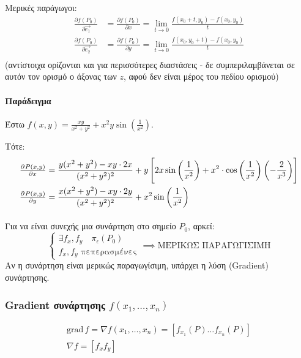 \documentclass[11pt,a4paper,titlepage,draft]{article}
\newcommand{\textlatin}[1]{#1}
\begin{document}
Μερικές παράγωγοι:
\begin{align*}
\frac{\partial f(P_0)}{\partial \vec{e_1}} &= \frac{\partial f(P_0)}{\partial x} = \lim_{t\to0} \frac{f(x_0+t,y_0)-f(x_0,y_0)}{t} \\
\frac{\partial f(P_0)}{\partial \vec{e_2}} &= \frac{\partial f(P_0)}{\partial y} = \lim_{t\to0} \frac{f(x_0,y_0+t)-f(x_0,y_0)}{t} \\
\end{align*}
(αντίστοιχα ορίζονται και για περισσότερες διαστάσεις - δε συμπεριλαμβάνεται σε αυτόν τον ορισμό ο άξονας των \(z\), αφού δεν είναι μέρος του πεδίου ορισμού)

\paragraph{Παράδειγμα}
Έστω \(f(x,y)=\frac{xy}{x^2+y^2}+x^2y\sin\left(\frac{1}{x^2}\right)\).

Τότε:
\begin{align*}
\pd{P(x,y)}{x} &= \frac{y(x^2+y^2)-xy\cdot2x}{(x^2+y^2)^2}
+ y \left[
2x\sin\left(\frac{1}{x^2}\right)
+x^2 \cdot \cos\left( \frac{1}{x^2}\right)\left( -\frac{2}{x^3} \right)
\right] \\
\pd{P(x,y)}{y} &=\frac{x(x^2+y^2)-xy\cdot2y}{(x^2+y^2)^2}+x^2\sin \left( \frac{1}{x^2}\right)
\end{align*}

\paragraph{}
Για να είναι συνεχής μια συνάρτηση στο σημείο \(P_0\), αρκεί:
\[
\begin{cases}
\exists f_x, f_y\quad \pi_\epsilon (P_0) \\
f_x,f_y\text{ πεπερασμένες}
\end{cases}
\implies\text{ΜΕΡΙΚΩΣ ΠΑΡΑΓΩΓΙΣΙΜΗ}
\]
Αν η συνάρτηση είναι μερικώς παραγωγίσιμη, υπάρχει η λύση (\textlatin{Gradient}) συνάρτησης.

\subsubsection{\textlatin{Gradient} συνάρτησης \(f(x_1,\dots,x_n)\)}
\begin{gather*}
\mathrm{grad}\,f = \nabla f(x_1,\dots,x_n) =
\left[
f_{x_1}(P)\dots f_{x_n}(P)
\right] \\
\nabla f = \left[ f_x f_y \right]
\end{gather*}
\end{document}
